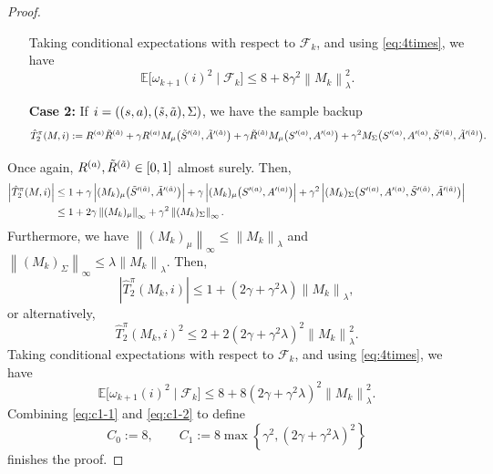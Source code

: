 \documentclass[accepted]{uai2026}
\theoremstyle{plain}
\theoremstyle{definition}
\theoremstyle{remark}
\newcommand{\E}{\mathbb{E}}
\newcommand{\Lvert}{\left\lvert}
\newcommand{\Rvert}{\right\rvert}
\newcommand{\LVert}{\left\lVert}
\newcommand{\RVert}{\right\rVert}
\newcommand{\1}{\mathbbm{1}}
\newcommand{\norm}[1]{\left\lVert #1\right\rVert}
\begin{document}
\begin{proof}
\begin{enumerate}[leftmargin=*, itemsep=2pt, align=left]
Taking conditional expectations with respect to $\mathcal{F}_k$, and using \eqref{eq:4times}, we have
\begin{equation}\label{eq:c1-1}
\E\big[\omega_{k+1}(i)^2 \mid \mathcal{F}_k\big] \le 8 + 8\gamma^2\LVert M_k\RVert^2_\lambda.
\end{equation}
\item[\textbf{Case 2:}] If $i = ((s, a), (\Tilde{s}, \Tilde{a}), \Sigma)$, we have the sample backup
\begin{equation}
\hat{T}^\pi_2(M, i):=R^{(a)}\Tilde{R}^{(\Tilde{a})}+\gamma R^{(a)} M_\mu\big(\Tilde{S}'^{(\Tilde{a})},\Tilde{A}'^{(\Tilde{a})}\big)+  \gamma \Tilde{R}^{(\Tilde{a})} M_\mu\big(S'^{(a)},A'^{(a)}\big) + \gamma^2 M_\Sigma\big(S'^{(a)}, A'^{(a)}, \Tilde{S}'^{(\Tilde{a})}, \Tilde{A}'^{(\Tilde{a})}\big).
\end{equation}
\end{enumerate}
Once again, $R^{(a)}, \Tilde{R}^{(\Tilde{a})} \in [0, 1]$ almost surely. Then,
\begin{equation}
\begin{split}
\Lvert \hat{T}^\pi_2(M, i) \Rvert &\le 1 + \gamma \Lvert (M_k)_\mu\big(\Tilde{S}'^{(\Tilde{a})},\Tilde{A}'^{(\Tilde{a})}\big)\Rvert + \gamma \Lvert(M_k)_\mu\big(S'^{(a)},A'^{(a)}\big) \Rvert + \gamma^2 \Lvert(M_k)_\Sigma\big(S'^{(a)}, A'^{(a)}, \Tilde{S}'^{(\Tilde{a})}, \Tilde{A}'^{(\Tilde{a})} \big) \Rvert \\
&\le 1 + 2\gamma \LVert (M_k)_\mu \RVert_\infty + \gamma^2 \LVert (M_k)_\Sigma \RVert_\infty.
\end{split}
\end{equation}
Furthermore, we have $\norm{(M_k)_\mu}_\infty \le \norm{M_k}_\lambda$ and $\norm{(M_k)_\Sigma}_\infty \le \lambda\norm{M_k}_\lambda$. Then,
\begin{equation}
\Lvert \hat{T}^\pi_2(M_k, i) \Rvert \le 1+ (2\gamma + \gamma^2\lambda) \LVert M_k \RVert_\lambda,
\end{equation}
or alternatively,
\begin{equation}
\hat{T}^\pi_2(M_k, i)^2 \le 2 + 2(2\gamma + \gamma^2\lambda)^2\LVert M_k \RVert^2_\lambda.
\end{equation}
Taking conditional expectations with respect to $\mathcal{F}_k$, and using \eqref{eq:4times}, we have
\begin{equation}\label{eq:c1-2}
\E\big[\omega_{k+1}(i)^2 \mid \mathcal{F}_k\big] \le 8 + 8(2\gamma +\gamma^2\lambda)^2\LVert M_k \RVert^2_\lambda.
\end{equation}
Combining \eqref{eq:c1-1} and \eqref{eq:c1-2} to define
\begin{equation}
C_0 := 8, \qquad C_1:= 8 \max\left\{\gamma^2, (2\gamma +\gamma^2\lambda)^2 \right\}
\end{equation}
finishes the proof.
\end{proof}
\end{document}
